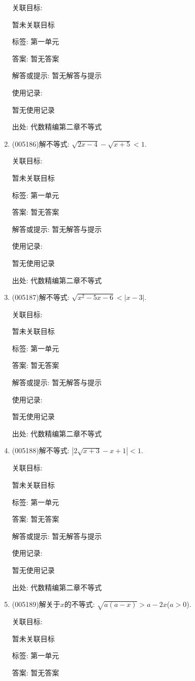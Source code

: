 \documentclass[10pt,a4paper]{article}
\begin{document}
\begin{enumerate}[1.]
关联目标:

暂未关联目标



标签: 第一单元

答案: 暂无答案

解答或提示: 暂无解答与提示

使用记录:

暂无使用记录


出处: 代数精编第二章不等式
\item { (005186)}解不等式: $\sqrt{2x-4}-\sqrt{x+5}<1$.


关联目标:

暂未关联目标



标签: 第一单元

答案: 暂无答案

解答或提示: 暂无解答与提示

使用记录:

暂无使用记录


出处: 代数精编第二章不等式
\item { (005187)}解不等式: $\sqrt{x^2-5x-6}<|x-3|$.


关联目标:

暂未关联目标



标签: 第一单元

答案: 暂无答案

解答或提示: 暂无解答与提示

使用记录:

暂无使用记录


出处: 代数精编第二章不等式
\item { (005188)}解不等式: $|2\sqrt{x+3}-x+1|<1$.


关联目标:

暂未关联目标



标签: 第一单元

答案: 暂无答案

解答或提示: 暂无解答与提示

使用记录:

暂无使用记录


出处: 代数精编第二章不等式
\item { (005189)}解关于$x$的不等式: $\sqrt{a(a-x)}>a-2x$($a>0$).


关联目标:

暂未关联目标



标签: 第一单元

答案: 暂无答案


\end{enumerate}
\end{document}
